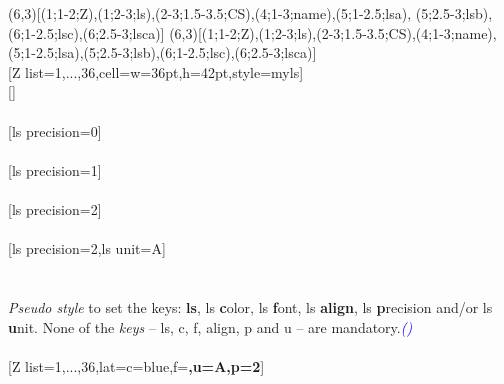 \newpage%
(6,3)[(1;1-2;Z),(1;2-3;ls),(2-3;1.5-3.5;CS),(4;1-3;name),(5;1-2.5;lsa), %
(5;2.5-3;lsb),(6;1-2.5;lsc),(6;2.5-3;lsca)]%
(6,3)[(1;1-2;Z),(1;2-3;ls),(2-3;1.5-3.5;CS),(4;1-3;name),(5;1-2.5;lsa),(5;2.5-3;lsb),(6;1-2.5;lsc),(6;2.5-3;lsca)]%
\\ [-4pt][Z list={1,...,36},cell={w=36pt,h=42pt,style=myls}]%
\pgfPTstyle[Z list={1,...,36},cell height=40pt,cell={w=36pt,h=42pt,style=myls}]%
\\ [-4pt][]%
\\ [5pt]\makebox[\linewidth][c]{\scalebox{.6}{\pgfPT}}%
\\ [10pt][ls precision=0]%
\\ [5pt]\makebox[\linewidth][c]{\scalebox{.6}{\pgfPT[ls precision=0]}}%
\\ [10pt][ls precision=1]%
\\ [5pt]\makebox[\linewidth][c]{\scalebox{.6}{\pgfPT[ls precision=1]}}%
\\ [10pt][ls precision=2]%
\\ [5pt]\makebox[\linewidth][c]{\scalebox{.6}{\pgfPT[ls precision=2]}}%
\\ [10pt][ls precision=2,ls unit=A]%
\\ [5pt]\makebox[\linewidth][c]{\scalebox{.6}{\pgfPT[ls precision=2,ls unit=A]}}%
\\ [0pt]\pgfPTendoption%
%
{\ \\ [-3pt]\textit{Pseudo style} to set the keys: \textbf{ls}, ls \textbf{c}olor, ls \textbf{f}ont, ls \textbf{align}, ls \textbf{p}recision and/or ls \textbf{u}nit.
None of the \textit{keys} -- ls, c, f, align, p and u -- are mandatory.\hfill\textit{\textcolor{blue}{()}}
\\ [10pt]%
}%
\\ [5pt][Z list={1,...,36},lat={c=blue,f=\string\tiny\string\bfseries,u=A,p=2}]%
\\ [5pt]\makebox[\linewidth][c]{\scalebox{.6}{\pgfPT[Z list={1,...,36},lat={c=blue,f=\tiny\bfseries,u=A,p=2}]}}%
\\ [0pt]\pgfPTendstyle%
\endinput
